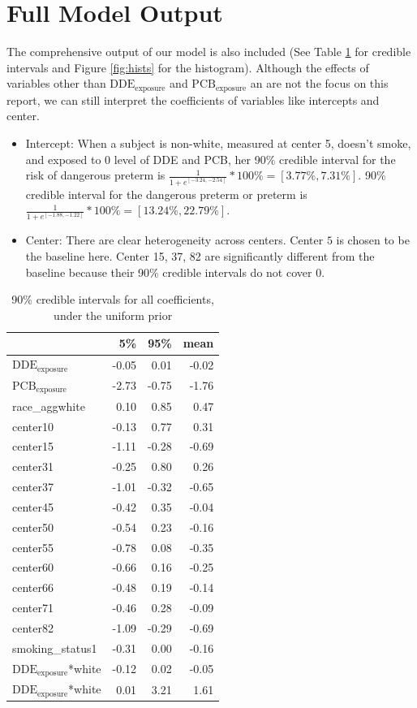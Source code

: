 \documentclass[10pt]{jmlr}%
\begin{document}
\section{Full Model Output}
The comprehensive output of our model is also included (See Table \ref{tab:fullcoef} for credible intervals and Figure \ref{fig:hists} for the histogram). Although the effects of variables other than $\text{DDE}_{\text{exposure}}$ and $\text{PCB}_{\text{exposure}}$ an are not the focus on this report, we can still interpret the coefficients of variables like intercepts and center. 
\begin{itemize}
	\item Intercept: When a subject is non-white, measured at center 5, doesn't smoke, and exposed to 0 level of DDE and PCB, her 90\% credible interval for the risk of dangerous preterm is $\frac{1}{1+e^{[-3.24, -2.54]}}*100\%=[3.77\%, 7.31\%]$.  90\% credible interval for the dangerous preterm or preterm is $\frac{1}{1+e^{[-1.88, -1.22]}}*100\%=[13.24\%, 22.79\%]$.
	
	\item Center: There are clear heterogeneity across centers. Center $5$ is chosen to be the baseline here. Center 15, 37, 82 are significantly different from the baseline because their 90\% credible intervals do not cover 0.
\end{itemize}

\begin{table}
	\centering
	\begin{tabular}{lrrr}
		\toprule
		 & 5\% & 95\% & mean\\
		\midrule
		$\text{DDE}_{\text{exposure}}$ & -0.05 & 0.01 & -0.02\\
		$\text{PCB}_{\text{exposure}}$ & -2.73 & -0.75 & -1.76\\
		race\_aggwhite & 0.10 & 0.85 & 0.47\\
		center10 & -0.13 & 0.77 & 0.31\\
		center15 & -1.11 & -0.28 & -0.69\\
		\addlinespace
		center31 & -0.25 & 0.80 & 0.26\\
		center37 & -1.01 & -0.32 & -0.65\\
		center45 & -0.42 & 0.35 & -0.04\\
		center50 & -0.54 & 0.23 & -0.16\\
		center55 & -0.78 & 0.08 & -0.35\\
		\addlinespace
		center60 & -0.66 & 0.16 & -0.25\\
		center66 & -0.48 & 0.19 & -0.14\\
		center71 & -0.46 & 0.28 & -0.09\\
		center82 & -1.09 & -0.29 & -0.69\\
		smoking\_status1 & -0.31 & 0.00 & -0.16\\
		\addlinespace
		$\text{DDE}_{\text{exposure}}$*white & -0.12 & 0.02 & -0.05\\
		$\text{DDE}_{\text{exposure}}$*white & 0.01 & 3.21 & 1.61\\
		\bottomrule
		\end{tabular}
	\label{tab:fullcoef}
	\caption{90\% credible intervals for all coefficients, under the uniform prior}
\end{table}
\end{document}
